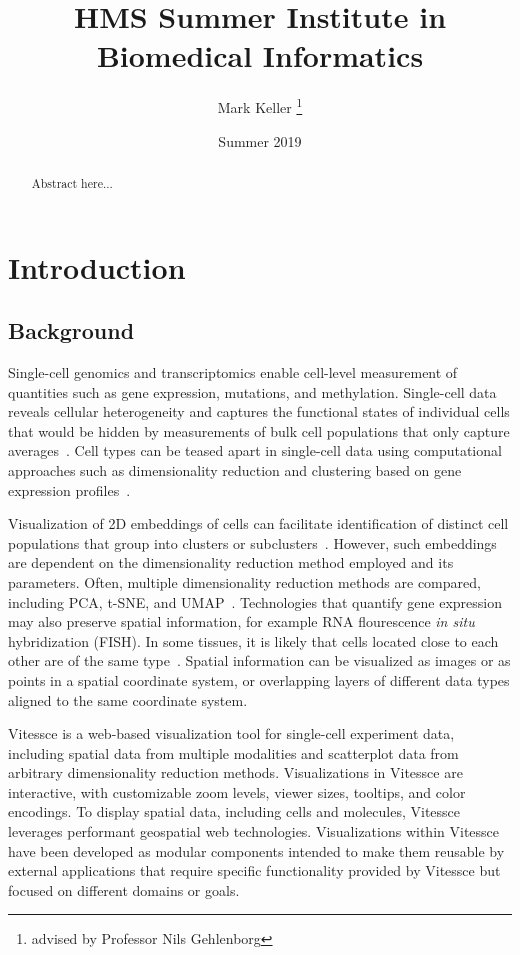 \documentclass[12pt, letterpaper]{article}
\title{HMS Summer Institute in Biomedical Informatics}
\author{Mark Keller \thanks{advised by Professor Nils Gehlenborg}}
\date{Summer 2019}
\begin{document}
\maketitle

\begin{abstract}
Abstract here...
\end{abstract}

\section{Introduction}
\subsection{Background}
Single-cell genomics and transcriptomics enable cell-level measurement of quantities such as gene expression, mutations, and methylation.
Single-cell data reveals cellular heterogeneity and captures the functional states of individual cells that would be hidden by measurements of bulk cell populations that only capture averages~\cite{shapiro2013single}.
Cell types can be teased apart in single-cell data using computational approaches such as dimensionality reduction and clustering based on gene expression profiles~\cite{stegle2015computational}.

Visualization of 2D embeddings of cells can facilitate identification of distinct cell populations that group into clusters or subclusters~\cite{wang2017visualization,staahl2016visualization}.
However, such embeddings are dependent on the dimensionality reduction method employed and its parameters.
Often, multiple dimensionality reduction methods are compared, including PCA, t-SNE, and UMAP~\cite{ovchinnikova2019exploring,becht2019dimensionality}.
Technologies that quantify gene expression may also preserve spatial information, for example RNA flourescence \textit{in situ} hybridization (FISH).
In some tissues, it is likely that cells located close to each other are of the same type~\cite{stegle2015computational}.
Spatial information can be visualized as images or as points in a spatial coordinate system, or overlapping layers of different data types aligned to the same coordinate system.

Vitessce is a web-based visualization tool for single-cell experiment data, including spatial data from multiple modalities and scatterplot data from arbitrary dimensionality reduction methods.
Visualizations in Vitessce are interactive, with customizable zoom levels, viewer sizes, tooltips, and color encodings.
To display spatial data, including cells and molecules, Vitessce leverages performant geospatial web technologies.
Visualizations within Vitessce have been developed as modular components intended to make them reusable by external applications that require specific functionality provided by Vitessce but focused on different domains or goals.
\end{document}

